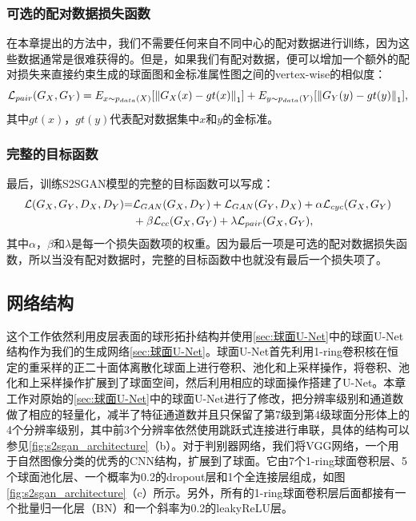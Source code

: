 \subsubsection{可选的配对数据损失函数}
在本章提出的方法中，我们不需要任何来自不同中心的配对数据进行训练，因为这些数据通常是很难获得的。但是，如果我们有配对数据，便可以增加一个额外的配对损失来直接约束生成的球面图和金标准属性图之间的vertex-wise的相似度：
\begin{equation}
	{{\cal L}_{pair}}({G_X},{G_Y}) = {E_{x\sim{p_{data}}(X)}}[{\left\| {{G_X}(x) - gt(x)} \right\|_1}] + {E_{y\sim{p_{data}}(Y)}}[{\left\| {{G_Y}(y) - gt(y)} \right\|_1}],
\end{equation}
其中$gt(x)$，$gt(y)$代表配对数据集中$x$和$y$的金标准。
	
\subsubsection{完整的目标函数} 
最后，训练S2SGAN模型的完整的目标函数可以写成：
\begin{equation}
\begin{split}
    {\cal L}({G_X},{G_Y},{D_X},{D_Y}){\rm{ = }} & {{\cal L}_{GAN}}({G_X},{D_Y}) + {{\cal L}_{GAN}}({G_Y},{D_X}) + \alpha {{\cal L}_{cyc}}({G_X},{G_Y})  \\
    & +\beta {{\cal L}_{cc}}({G_X},{G_Y}) + \lambda {{\cal L}_{pair}}({G_X},{G_Y}),
\end{split}
\end{equation}
其中$\alpha$，$\beta$和$\lambda$是每一个损失函数项的权重。因为最后一项是可选的配对数据损失函数，所以当没有配对数据时，完整的目标函数中也就没有最后一个损失项了。
	
\subsection{网络结构}
这个工作依然利用皮层表面的球形拓扑结构并使用\ref{sec:球面U-Net}中的球面U-Net结构作为我们的生成网络\ref{sec:球面U-Net}。球面U-Net首先利用1-ring卷积核在恒定的重采样的正二十面体离散化球面上进行卷积、池化和上采样操作，将卷积、池化和上采样操作扩展到了球面空间，然后利用相应的球面操作搭建了U-Net。本章工作对原始的\ref{sec:球面U-Net}中的球面U-Net进行了修改，把分辨率级别和通道数做了相应的轻量化，减半了特征通道数并且只保留了第7级到第4级球面分形体上的4个分辨率级别，其中前3个分辨率依然使用跳跃式连接进行串联，具体的结构可以参见\ref{fig:s2sgan_architecture}（b）。对于判别器网络，我们将VGG\cite{simonyan2014very}网络，一个用于自然图像分类的优秀的CNN结构，扩展到了球面。它由7个1-ring球面卷积层、5个球面池化层、一个概率为0.2的dropout层和1个全连接层组成，如图\ref{fig:s2sgan_architecture}（c）所示。另外，所有的1-ring球面卷积层后面都接有一个批量归一化层（BN）和一个斜率为0.2的leakyReLU层。

